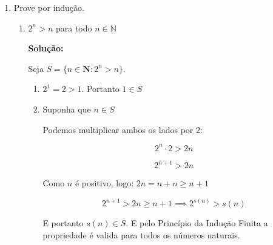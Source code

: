 \documentclass[
  12pt,
  openright,
  a4paper,
  twoside,
  english,
  brazil,
]{article}
\begin{document}
\begin{enumerate}[\bfseries  1.]
\begin{enumerate}[\bfseries (a)]
        Agora considerando o termo de $a_n$ e reorganizando:
        $$
        S_n=n(\frac{a_1+a_1+(n-1)r}{2})=\frac{(a_1+a_n)n}{2}
        $$

    \end{enumerate}

    \newpage

  \item Prove por indução.

    \begin{enumerate}[\bfseries (a)]
      \item $2^n>n$ para todo $n\in\mathbb N$

        \textbf{Solução:}

        Seja $S=\{n\in\mathbf N:2^n>n\}$.
        \begin{enumerate}[1.]
          \item $2^1 = 2 > 1$. Portanto $1\in S$
          \item Suponha que $n\in S$

            Podemos multiplicar ambos os lados por $2$:

            $$
            2^n\cdot2 > 2n
            $$

            $$
            2^{n+1} > 2n
            $$

            Como $n$ é positivo, logo: $2n = n + n \ge n + 1$

            $$
            2^{n+1} > 2n \ge n + 1\implies 2^{s(n)}> s(n)
            $$

            E portanto $s(n)\in S$. E pelo Princípio da Indução
            Finita a propriedade é valida para todos os números naturais.

        \end{enumerate}
    \end{enumerate}

\end{enumerate}
\end{document}

